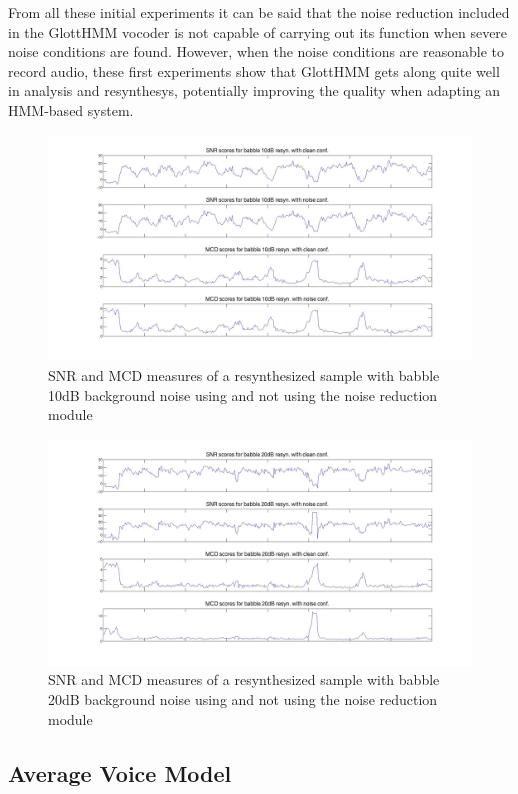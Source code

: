 From all these initial experiments it can be said that the noise reduction included in the GlottHMM vocoder is not capable of carrying out its function when severe noise conditions are found.
%
However, when the noise conditions are reasonable to record audio, these first experiments show that GlottHMM gets along quite well in analysis and resynthesys, potentially improving the quality when adapting an HMM-based system. 

\begin{figure}[!htb]
\begin{adjustwidth}{-2.6cm}{}
\includegraphics[width=1.3\textwidth]{images/babble10clean_vs_noise.jpg}
\end{adjustwidth}
\caption{SNR and MCD measures of a resynthesized sample with babble 10dB background noise using and not using the noise reduction module}
\label{fig:babble10_clean_vs_noise}
\end{figure}

\begin{figure}[!htb]
\begin{adjustwidth}{-2.6cm}{}
\includegraphics[width=1.3\textwidth]{images/babble20clean_vs_noise.jpg}
\end{adjustwidth}
\caption{SNR and MCD measures of a resynthesized sample with babble 20dB background noise using and not using the noise reduction module}
\label{fig:babble20_clean_vs_noise}
\end{figure}

\subsection{Average Voice Model}
\label{experiments_av_voice_model}

